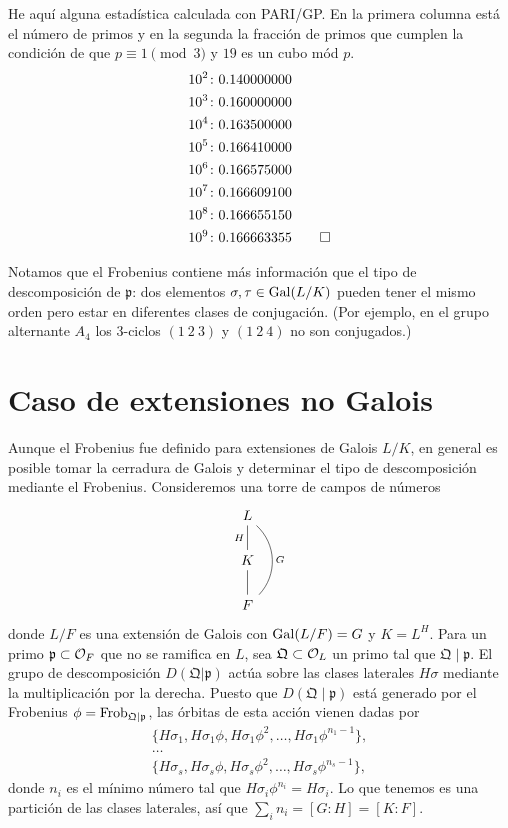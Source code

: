 \begin{ejemplo}
  He aquí alguna estadística calculada con PARI/GP. En la primera columna está
  el número de primos y en la segunda la fracción de primos que cumplen la
  condición de que $p \equiv 1 \pmod{3}$ y $19$ es un cubo mód $p$.
  \begin{align*}
    10^2\colon & 0.140000000 \\
    10^3\colon & 0.160000000 \\
    10^4\colon & 0.163500000 \\
    10^5\colon & 0.166410000 \\
    10^6\colon & 0.166575000 \\
    10^7\colon & 0.166609100 \\
    10^8\colon & 0.166655150 \\
    10^9\colon & 0.166663355 \qedhere
  \end{align*}
\end{ejemplo}

Notamos que el Frobenius contiene más información que el tipo de descomposición
de $\mathfrak{p}$: dos elementos $\sigma,\tau\in \operatorname{Gal} (L/K)$ pueden tener el
mismo orden pero estar en diferentes clases de conjugación. (Por ejemplo, en el
grupo alternante $A_4$ los $3$-ciclos $(1~2~3)$ y $(1~2~4)$ no son conjugados.)


\section{Caso de extensiones no Galois}

Aunque el Frobenius fue definido para extensiones de Galois $L/K$, en general es
posible tomar la cerradura de Galois y determinar el tipo de descomposición
mediante el Frobenius. Consideremos una torre de campos de números
\[ \begin{tikzcd}
  L\ar[-]{d}[swap]{H}\ar[-,bend left=45]{dd}{G} \\
  K\ar[-]{d} \\
  F
\end{tikzcd} \]
donde $L/F$ es una extensión de Galois con $\operatorname{Gal} (L/F) = G$ y $K = L^H$.
Para un primo $\mathfrak{p} \subset \mathcal{O}_F$ que no se ramifica en $L$, sea
$\mathfrak{Q} \subset \mathcal{O}_L$ un primo tal que $\mathfrak{Q} \mid \mathfrak{p}$.
El grupo de descomposición $D (\mathfrak{Q}|\mathfrak{p})$ actúa sobre
las clases laterales $H\sigma$ mediante la multiplicación por la derecha.
Puesto que $D (\mathfrak{Q}\mid\mathfrak{p})$ está generado por el Frobenius
$\phi = \operatorname{Frob}_{\mathfrak{Q}|\mathfrak{p}}$, las órbitas de esta acción vienen
dadas por
\begin{gather*}
  \{ H \sigma_1, H \sigma_1 \phi, H \sigma_1 \phi^2, \ldots, H \sigma_1 \phi^{n_1 - 1} \}, \\
  \dots \\
  \{ H \sigma_s, H \sigma_s \phi, H \sigma_s \phi^2, \ldots, H \sigma_s \phi^{n_s - 1} \},
\end{gather*}
donde $n_i$ es el mínimo número tal que $H \sigma_i \phi^{n_i} = H \sigma_i$.
Lo que tenemos es una partición de las clases laterales, así que
$\sum_i n_i = [G : H] = [K : F]$.

